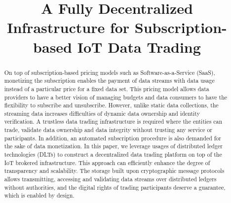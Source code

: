 \documentclass[conference]{IEEEtran}
\begin{document}
\title{A Fully Decentralized Infrastructure for Subscription-based IoT Data Trading}

\author{
}

\maketitle


\begin{abstract} 
On top of subscription-based pricing models such as Software-as-a-Service (SaaS), monetizing the subscription enables the payment of data streams with data usage instead of a particular price for a fixed data set. This pricing model allows data providers to have a better vision of managing budgets and data consumers to have the flexibility to subscribe and unsubscribe. However, unlike static data collections, the streaming data increases difficulties of dynamic data ownership and identity verification. A trustless data trading infrastructure is required where the entities can trade, validate data ownership and data integrity without trusting any service or participants. In addition, an automated subscription procedure is also demanded for the sake of data monetization. In this paper, we leverage usages of distributed ledger technologies (DLTs) to construct a decentralized data trading platform on top of the IoT brokered infrastructure. This approach can efficiently enhance the degree of transparency and scalability. The storage built upon cryptographic message protocols allows transmitting, accessing and validating data streams over distributed ledgers without authorities, and the digital rights of trading participants deserve a guarantee, which is enabled by design.
\end{abstract}
\end{document}
